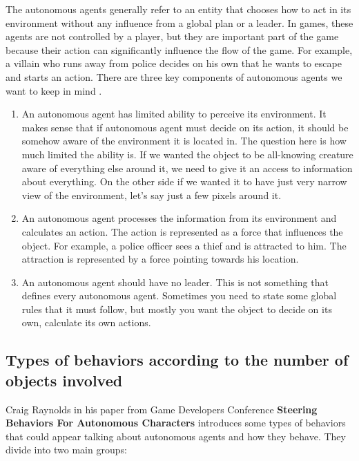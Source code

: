 \documentclass[10pt,twoside,english,a4paper]{article}
\begin{document}
The autonomous agents generally refer to an entity that chooses how to act in its environment without any influence from a global plan or a leader. In games, these agents are not controlled by a player, but they are important part of the game because their action can significantly influence the flow of the game. For example, a villain who runs away from police decides on his own that he wants to escape and starts an action. There are three key components of autonomous agents we want to keep in mind \cite{Verhagen}. 

\begin{enumerate}
\item An autonomous agent has limited ability to perceive its environment. It makes sense that if autonomous agent must decide on its action, it should be somehow aware of the environment it is located in. The question here is how much limited the ability is. If we wanted the object to be all-knowing creature aware of everything else around it, we need to give it an access to information about everything. On the other side if we wanted it to have just very narrow view of the environment, let’s say just a few pixels around it.

\item An autonomous agent processes the information from its environment and calculates an action. The action is represented as a force that influences the object. For example, a police officer sees a thief and is attracted to him. The attraction is represented by a force pointing towards his location. 

\item An autonomous agent should have no leader. This is not something that defines every autonomous agent. Sometimes you need to state some global rules that it must follow, but mostly you want the object to decide on its own, calculate its own actions.

\end{enumerate}

\subsection{Types of behaviors according to the number of objects involved} \label{types of behaviors}

Craig Raynolds in his paper from Game Developers Conference \textbf{Steering Behaviors For Autonomous Characters} \cite{Raynolds} introduces some types of behaviors that could appear talking about autonomous agents and how they behave. They divide into two main groups:
\end{document}
